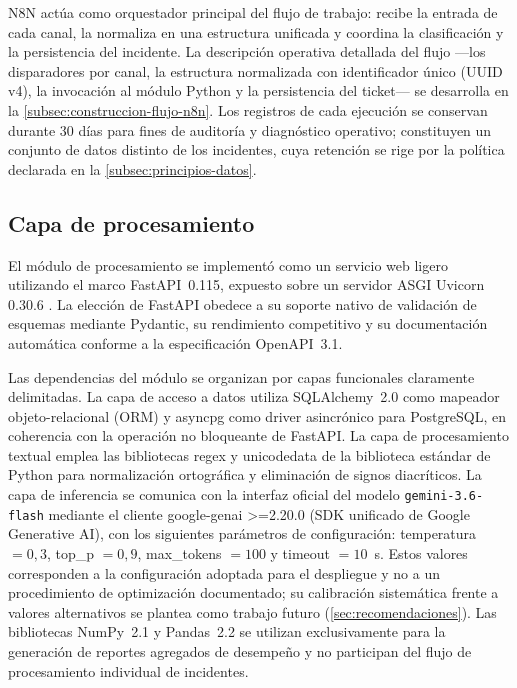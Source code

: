 N8N actúa como orquestador principal del flujo de trabajo: recibe la entrada de cada canal, la normaliza en una estructura unificada y coordina la clasificación y la persistencia del incidente. La descripción operativa detallada del flujo ---los disparadores por canal, la estructura normalizada con identificador único (UUID v4), la invocación al módulo Python y la persistencia del ticket--- se desarrolla en la \autoref{subsec:construccion-flujo-n8n}. Los registros de cada ejecución se conservan durante 30 días para fines de auditoría y diagnóstico operativo; constituyen un conjunto de datos distinto de los incidentes, cuya retención se rige por la política declarada en la \autoref{subsec:principios-datos}.

\subsection{Capa de procesamiento}\label{subsec:capa-procesamiento}

El módulo de procesamiento se implementó como un servicio web ligero utilizando el marco FastAPI~0.115, expuesto sobre un servidor ASGI Uvicorn 0.30.6 \parencite{Tiangolo2024_fastapi}. La elección de FastAPI obedece a su soporte nativo de validación de esquemas mediante Pydantic, su rendimiento competitivo y su documentación automática conforme a la especificación OpenAPI~3.1.

Las dependencias del módulo se organizan por capas funcionales claramente delimitadas. La capa de acceso a datos utiliza SQLAlchemy~2.0 como mapeador objeto-relacional (ORM) y asyncpg como driver asincrónico para PostgreSQL, en coherencia con la operación no bloqueante de FastAPI. La capa de procesamiento textual emplea las bibliotecas regex y unicodedata de la biblioteca estándar de Python para normalización ortográfica y eliminación de signos diacríticos. La capa de inferencia se comunica con la interfaz oficial del modelo \texttt{gemini-3.6-flash} mediante el cliente google-genai >=2.20.0 (SDK unificado de Google Generative AI), con los siguientes parámetros de configuración: temperatura \(= 0{,}3\), top\_p \(= 0{,}9\), max\_tokens \(= 100\) y timeout \(= 10\)~s. Estos valores corresponden a la configuración adoptada para el despliegue y no a un procedimiento de optimización documentado; su calibración sistemática frente a valores alternativos se plantea como trabajo futuro (\autoref{sec:recomendaciones}). Las bibliotecas NumPy~2.1 y Pandas~2.2 se utilizan exclusivamente para la generación de reportes agregados de desempeño y no participan del flujo de procesamiento individual de incidentes.

